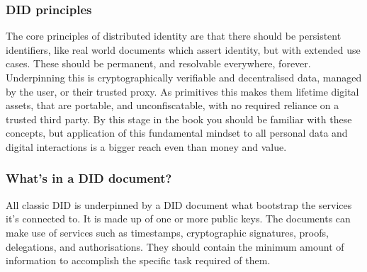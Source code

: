 \subsubsection{DID principles}
The core principles of distributed identity are that there should be persistent identifiers, like real world documents which assert identity, but with extended use cases. These should be permanent, and resolvable everywhere, forever. Underpinning this is cryptographically verifiable and decentralised data, managed by the user, or their trusted proxy. As primitives this makes them lifetime digital assets, that are portable, and unconfiscatable, with no required reliance on a trusted third party. By this stage in the book you should be familiar with these concepts, but application of this fundamental mindset to all personal data and digital interactions is a bigger reach even than money and value.
\subsubsection{What's in a DID document?}
All classic DID is underpinned by a DID document what bootstrap the services it's connected to. It is made up of one or more public keys. The documents can make use of services such as timestamps, cryptographic signatures, proofs, delegations, and authorisations. They should contain the minimum amount of information to accomplish the specific task required of them.
